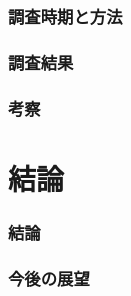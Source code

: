 \documentclass[10.5pt,twocolumn]{jsarticle}
\begin{document}
\section{調査時期と方法}

\section{調査結果}

\section{考察}

\part{結論}
\section{結論}

\section{今後の展望}
\begin{thebibliography}{2501}

\end{thebibliography}
\end{document}
